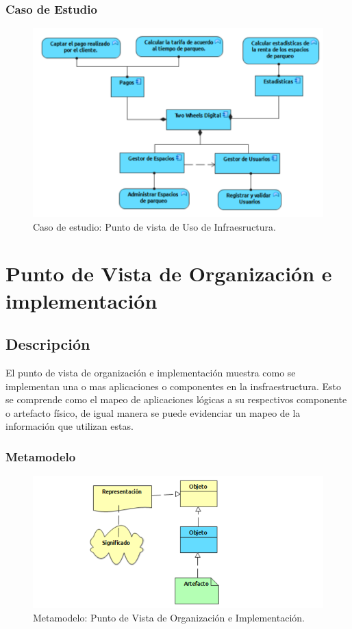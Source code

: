 \subsubsection{Caso de Estudio}


\begin{figure}[H]
	\centering
	\includegraphics[width=1.0\textwidth]{imagenes/Caso_Estudio/Tecnologia/ComAplicacion.PDF}
	\caption{Caso de estudio: Punto de vista de Uso de Infraesructura.}
	\label{fig:gap_analysis}
\end{figure}


\section{Punto de Vista de Organización e implementación}
\subsection{Descripción}
El punto de vista de organización e implementación muestra como se implementan una o mas aplicaciones o componentes en la insfraestructura. Esto se comprende como el mapeo de aplicaciones lógicas a su respectivos componente o artefacto físico, de igual manera se puede evidenciar un mapeo de  la información que utilizan estas.

\subsubsection{Metamodelo}
\begin{figure}[H]
	\centering
	\includegraphics[width=1.0\textwidth]{imagenes/Metamodelos/Tecnologia/Estructura_informacion.PDF}
	\caption{Metamodelo: Punto de Vista de Organización e Implementación.}
	\label{fig:gap_analysis}
\end{figure}

